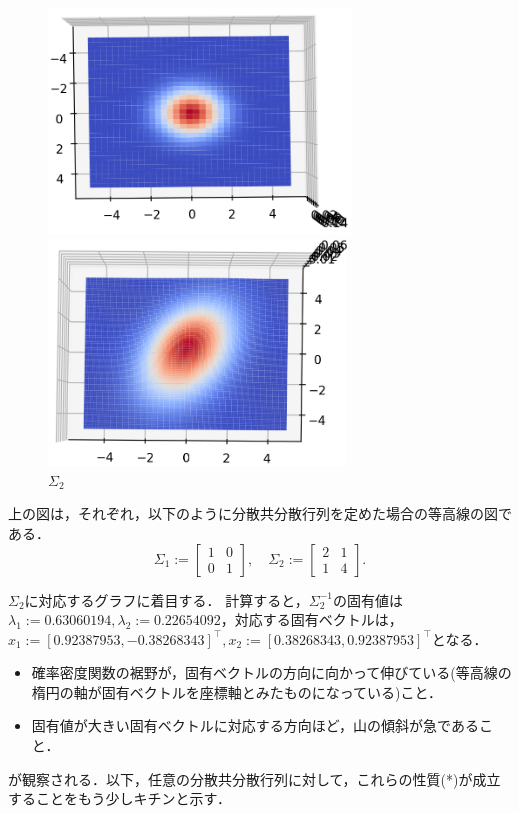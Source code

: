 \documentclass[11pt,a4paper,dvipdfmx]{article}
\theoremstyle{plain}
\newcommand{\1}{\mbox{1}\hspace{-0.25em}\mbox{l}}
\begin{document}
\begin{figure}[H]
  \centering
  \begin{minipage}{0.48\hsize}
    \centering
    \includegraphics[height=6cm]{image/Figure_1.png}
    \caption{$\Sigma_1$}
    \label{fig:s2_prf_1}
  \end{minipage}
  \begin{minipage}{0.48\hsize}
    \centering
    \includegraphics[height=6cm]{image/Figure_2.png}
    \caption{$\Sigma_2$}
    \label{fig:s2_prf_2}
  \end{minipage}
\end{figure}

上の図は，それぞれ，以下のように分散共分散行列を定めた場合の等高線の図である．
$$
\Sigma_1 := \left[
\begin{matrix}
	1 & 0 \\
	0 & 1
\end{matrix}
\right],
\quad
\Sigma_2 := \left[
\begin{matrix}
	2 & 1 \\
	1 & 4
\end{matrix}
\right].
$$

$\Sigma_2$に対応するグラフに着目する．
計算すると，$\Sigma_2^{-1}$の固有値は$\lambda_1 := 0.63060194,  \lambda_2 :=0.22654092$，対応する固有ベクトルは，
$x_1 := [0.92387953,-0.38268343]^\top, x_2 := [0.38268343, 0.92387953]^\top$となる．
\begin{itemize}
	\item 確率密度関数の裾野が，固有ベクトルの方向に向かって伸びている(等高線の楕円の軸が固有ベクトルを座標軸とみたものになっている)こと．
	\item 固有値が大きい固有ベクトルに対応する方向ほど，山の傾斜が急であること．
\end{itemize}
が観察される．以下，任意の分散共分散行列に対して，これらの性質(*)が成立することをもう少しキチンと示す．
\end{document}

